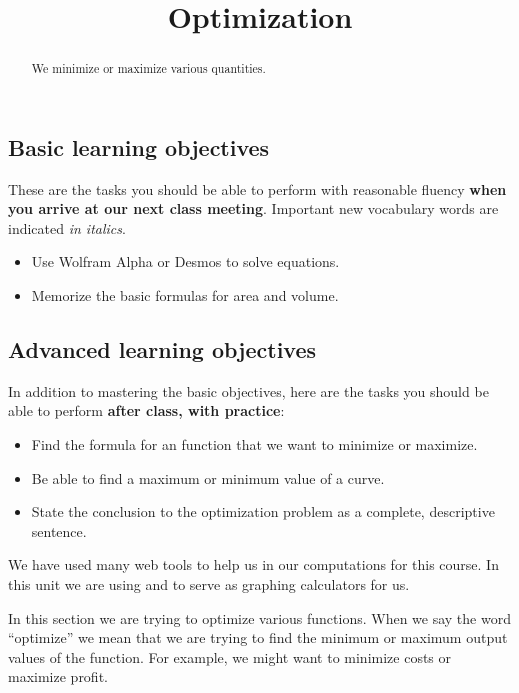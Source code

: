 \documentclass{ximera}
\title{Optimization}
\begin{document}
\begin{abstract}
We minimize or maximize various quantities.
\end{abstract}
\maketitle

\subsection*{Basic learning objectives}

These are the tasks you should be able to perform with reasonable fluency \textbf{when you arrive at our next class meeting}. Important new vocabulary words are indicated \emph{in italics}. 

\begin{itemize}
	\item Use Wolfram Alpha or Desmos to solve equations.
    \item Memorize the basic formulas for area and volume.
\end{itemize}

\subsection*{Advanced learning objectives}

In addition to mastering the basic objectives, here are the tasks you should be able to perform \textbf{after class, with practice}: 

\begin{itemize}
	\item Find the formula for an function that we want to minimize or maximize.
    \item Be able to find a maximum or minimum value of a curve.
    \item State the conclusion to the optimization problem as a complete, descriptive sentence.
\end{itemize}

\noindent\hrulefill

We have used many web tools to help us in our computations for this course. In this unit we are using  and  to serve as graphing calculators for us. 

In this section we are trying to optimize various functions. When we say the word ``optimize'' we mean that we are trying to find the minimum or maximum output values of the function. For example, we might want to minimize costs or maximize profit.
\end{document}
